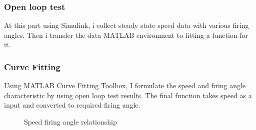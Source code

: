 \documentclass[fleqn, a4paper]{report}
\begin{document}
\subsubsection{Open loop test}
At this part using Simulink, i collect steady state speed data with various firing angles. Then i transfer the data MATLAB environment to fitting a function for it. 
\subsubsection{Curve Fitting}
Using MATLAB Curve Fitting Toolbox, I formulate the speed and firing angle characteristic by using open loop test results. The final function takes speed as a input and converted to required firing angle.

\begin{figure}[H]%
    \centering
    \qquad
    \caption{Speed firing angle relationship}%
    \label{fig:example}%
\end{figure}
\end{document}
